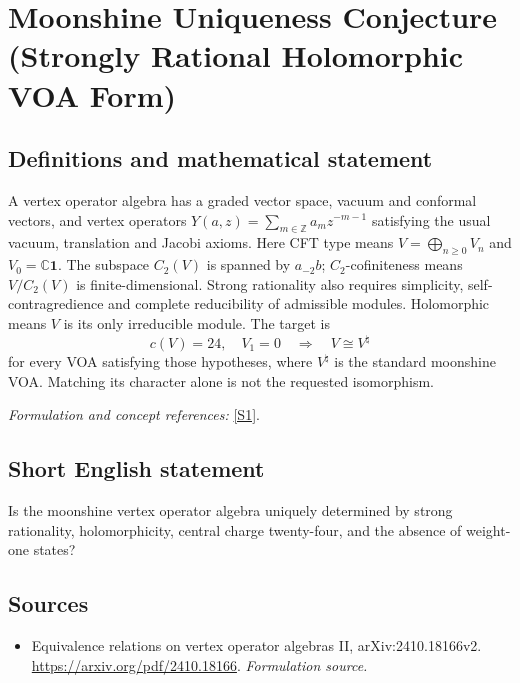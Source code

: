 \documentclass[11pt]{article}
\begin{document}
\section*{\texorpdfstring{Moonshine Uniqueness Conjecture (Strongly Rational Holomorphic VOA Form)}{Moonshine Uniqueness Conjecture (Strongly Rational Holomorphic VOA Form)}}\label{257}
\subsection{Definitions and mathematical statement}
A vertex operator algebra has a graded vector space, vacuum and conformal vectors, and vertex operators $Y(a,z)=\sum_{m\in{\mathbb{Z}}}a_mz^{-m-1}$ satisfying the usual vacuum, translation and Jacobi axioms. Here CFT type means $V=\bigoplus_{n\ge0}V_n$ and $V_0={\mathbb{C}}\mathbf1$. The subspace $C_2(V)$ is spanned by $a_{-2}b$; $C_2$-cofiniteness means $V/C_2(V)$ is finite-dimensional. Strong rationality also requires simplicity, self-contragredience and complete reducibility of admissible modules. Holomorphic means $V$ is its only irreducible module. The target is
\[
 c(V)=24,\quad V_1=0\quad\Longrightarrow\quad V\cong V^{\natural}
\]
for every VOA satisfying those hypotheses, where $V^{\natural}$ is the standard moonshine VOA. Matching its character alone is not the requested isomorphism.
\par\smallskip\textit{Formulation and concept references:} \href{https://arxiv.org/pdf/2410.18166}{[S1]}.

\subsection{Short English statement}
Is the moonshine vertex operator algebra uniquely determined by strong rationality, holomorphicity, central charge twenty-four, and the absence of weight-one states?
\subsection{Sources}
\begin{itemize}
\item[S1]Equivalence relations on vertex operator algebras II, arXiv:2410.18166v2.
\url{https://arxiv.org/pdf/2410.18166}.
\textit{Formulation source.}
\end{itemize}
\end{document}

